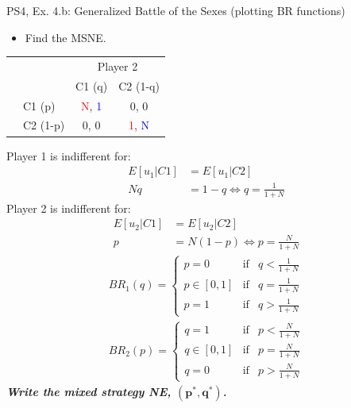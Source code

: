 \begin{frame}{PS4, Ex. 4.b: Generalized Battle of the Sexes (plotting BR functions)}
  \begin{multicols}{2}
    \begin{itemize}
      \item[(b)] Find the MSNE.
    \end{itemize}
    \vspace{-12pt}
    \begin{table}
      \begin{tabular}{cl|c|c|}
          & \multicolumn{1}{c}{} & \multicolumn{2}{c}{\color{blue}Player 2}\\
          \parbox[t]{1mm}{}
          &  &  &  \\
          & C1 (p)    & \textcolor{red}{N}, \textcolor{blue}{1} & 0, 0 \\
          & C2 (1-p)  & 0, 0 & \textcolor{red}{1}, \textcolor{blue}{N} \\
      \end{tabular}
    \end{table}
    Player 1 is indifferent for:
    \vspace{-2pt}
    \begin{align*}
      E[u_1|C1]&=E[u_1|C2]\\
      Nq &= 1-q \Leftrightarrow q = \frac{1}{1+N}
    \end{align*}
    Player 2 is indifferent for:
    \vspace{-2pt}
    \begin{align*}
      E[u_2|C1]&=E[u_2|C2]\\
      p &= N(1-p) \Leftrightarrow p = \frac{N}{1+N}
    \end{align*}
    \vspace{-8pt}
    \begin{align*}
      BR_1(q)=\left\{ \begin{array}{lcl}
          p=0       & \text{if} & q<\frac{1}{1+N} \\
          p\in[0,1] & \text{if} & q=\frac{1}{1+N} \\
          p=1       & \text{if} & q>\frac{1}{1+N}
      \end{array}\right. \\
      BR_2(p)=\left\{ \begin{array}{lcl}
          q=1       & \text{if} & p<\frac{N}{1+N}  \\
          q\in[0,1] & \text{if} & p=\frac{N}{1+N} \\
          q=0       & \text{if} & p>\frac{N}{1+N}
      \end{array}\right.
    \end{align*}
  \vfill\null \columnbreak
    \textbf{\textit{Write the mixed strategy NE, $\bm{(p^{*},q^{*})}$.}}
  \vfill\null
  \end{multicols}
\end{frame}
